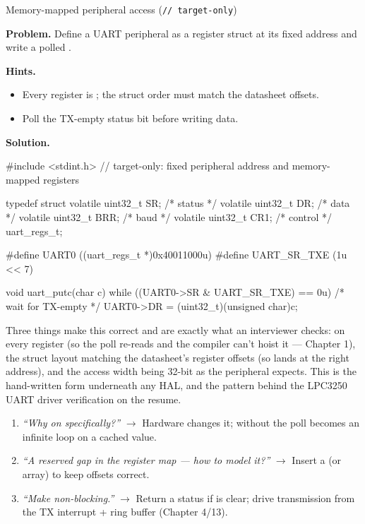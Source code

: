 \begin{gymproblem}{Memory-mapped peripheral access
(\texttt{// target-only})}

\textbf{Problem.} Define a UART peripheral as a  register struct
at its fixed address and write a polled .

\textbf{Hints.}
\begin{itemize}
\item Every register is ; the struct order must match
  the datasheet offsets.
\item Poll the TX-empty status bit before writing data.
\end{itemize}

\attempt

\textbf{Solution.}
\begin{cgym}
#include <stdint.h>
// target-only: fixed peripheral address and memory-mapped registers

typedef struct {
    volatile uint32_t SR;    /* status   */
    volatile uint32_t DR;    /* data     */
    volatile uint32_t BRR;   /* baud     */
    volatile uint32_t CR1;   /* control  */
} uart_regs_t;

#define UART0        ((uart_regs_t *)0x40011000u)
#define UART_SR_TXE  (1u << 7)

void uart_putc(char c) {
    while ((UART0->SR & UART_SR_TXE) == 0u) { /* wait for TX-empty */ }
    UART0->DR = (uint32_t)(unsigned char)c;
}
\end{cgym}

Three things make this correct and are exactly what an interviewer checks:
 on every register (so the poll re-reads  and the
compiler can't hoist it --- Chapter 1), the struct layout matching the
datasheet's register offsets (so  lands at the right address), and
the access width being 32-bit as the peripheral expects. This is the
hand-written form underneath any HAL, and the pattern behind the LPC3250 UART
driver verification on the resume.

\followups
\begin{enumerate}
\item \emph{``Why  on  specifically?''} $\rightarrow$
  Hardware changes it; without  the poll becomes an infinite
  loop on a cached value.
\item \emph{``A reserved gap in the register map --- how to model it?''}
  $\rightarrow$ Insert a  (or array) to
  keep offsets correct.
\item \emph{``Make  non-blocking.''} $\rightarrow$ Return a status
  if  is clear; drive transmission from the TX interrupt + ring
  buffer (Chapter 4/13).
\end{enumerate}
\end{gymproblem}

